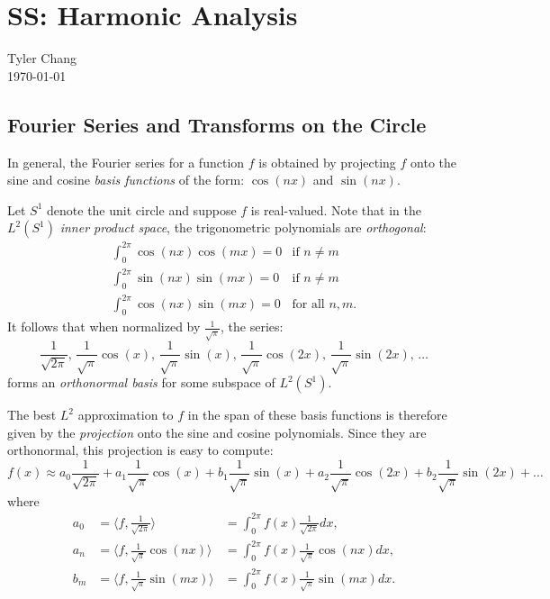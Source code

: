 \documentclass[12pt]{article}
\begin{document}
\section*{SS: Harmonic Analysis}
Tyler Chang\\
\today

\subsection*{Fourier Series and Transforms on the Circle}

In general, the Fourier series for a function $f$ is obtained by projecting
$f$ onto the sine and cosine {\it basis functions} of the form:
$\cos(nx)$ and $\sin(nx)$.

Let $S^1$ denote the unit circle and suppose $f$ is real-valued.
Note that in the $L^2(S^1)$ {\it inner product space}, the trigonometric
polynomials are {\it orthogonal}:
$$
\begin{array}{lr}
\int_0^{2\pi}\cos(nx)\cos(mx) = 0 & \text{if $n\neq m$}\\
\int_0^{2\pi}\sin(nx)\sin(mx) = 0 & \text{if $n\neq m$}\\
\int_0^{2\pi}\cos(nx)\sin(mx) = 0 & \text{for all $n,m$}.
\end{array}
$$
It follows that when normalized by $\frac{1}{\sqrt{\pi}}$, the series:
$$
\frac{1}{\sqrt{2\pi}}
\text{, }\frac{1}{\sqrt{\pi}}\cos(x)
\text{, }\frac{1}{\sqrt{\pi}}\sin(x)
\text{, }\frac{1}{\sqrt{\pi}}\cos(2x)
\text{, }\frac{1}{\sqrt{\pi}}\sin(2x)
\text{, }\ldots
$$
forms an {\it orthonormal basis} for some subspace of $L^2(S^1)$.

The best $L^2$ approximation to $f$ in the span of these basis functions
is therefore given by the {\it projection} onto the sine and cosine
polynomials.
Since they are orthonormal, this projection is easy to compute:
$$
f(x) \approx a_0\frac{1}{\sqrt{2\pi}}
+ a_1\frac{1}{\sqrt{\pi}}\cos(x)
+ b_1\frac{1}{\sqrt{\pi}}\sin(x)
+ a_2\frac{1}{\sqrt{\pi}}\cos(2x)
+ b_2\frac{1}{\sqrt{\pi}}\sin(2x)
+ \ldots
$$
where 
$$\begin{array}{rll}
a_0
&=\langle f,\frac{1}{\sqrt{2\pi}}\rangle
&=\int_0^{2\pi}f(x)\frac{1}{\sqrt{2\pi}}dx,\\
a_n
&=\langle f,\frac{1}{\sqrt{\pi}}\cos(nx)\rangle
&=\int_0^{2\pi}f(x)\frac{1}{\sqrt{\pi}}\cos(nx)dx,\\
b_m
&=\langle f,\frac{1}{\sqrt{\pi}}\sin(mx)\rangle
&=\int_0^{2\pi}f(x)\frac{1}{\sqrt{\pi}}\sin(mx)dx.
\end{array}$$
\end{document}
